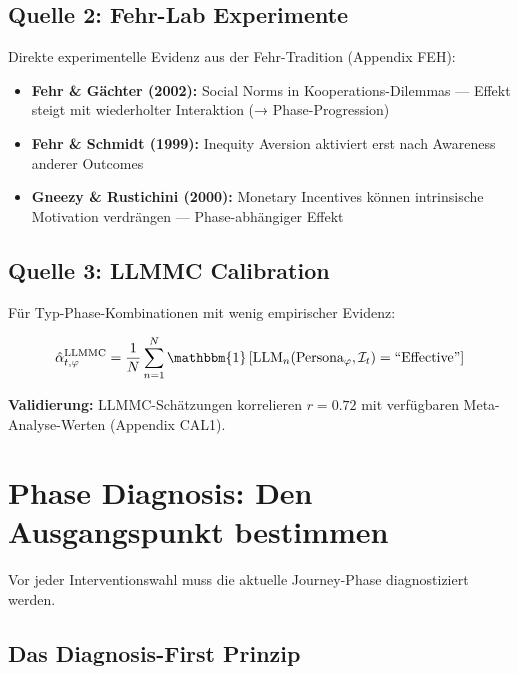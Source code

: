 \subsection{Quelle 2: Fehr-Lab Experimente}

Direkte experimentelle Evidenz aus der Fehr-Tradition (Appendix FEH):

\begin{itemize}
\item \textbf{Fehr \& Gächter (2002):} Social Norms in Kooperations-Dilemmas --- Effekt steigt mit wiederholter Interaktion (→ Phase-Progression)
\item \textbf{Fehr \& Schmidt (1999):} Inequity Aversion aktiviert erst nach Awareness anderer Outcomes
\item \textbf{Gneezy \& Rustichini (2000):} Monetary Incentives können intrinsische Motivation verdrängen --- Phase-abhängiger Effekt
\end{itemize}

\subsection{Quelle 3: LLMMC Calibration}

Für Typ-Phase-Kombinationen mit wenig empirischer Evidenz:

\begin{equation}
\hat{\alpha}_{t,\varphi}^{\text{LLMMC}} = \frac{1}{N} \sum_{n=1}^{N} \mathbbm{1}\left[ \text{LLM}_n(\text{Persona}_\varphi, \mathcal{I}_t) = \text{``Effective''} \right]
\label{eq:18-llmmc-alpha}
\end{equation}

\textbf{Validierung:} LLMMC-Schätzungen korrelieren $r = 0.72$ mit verfügbaren Meta-Analyse-Werten (Appendix CAL1).


\section{Phase Diagnosis: Den Ausgangspunkt bestimmen}
\label{sec:18-diagnosis}

Vor jeder Interventionswahl muss die aktuelle Journey-Phase diagnostiziert werden.

\subsection{Das Diagnosis-First Prinzip}

